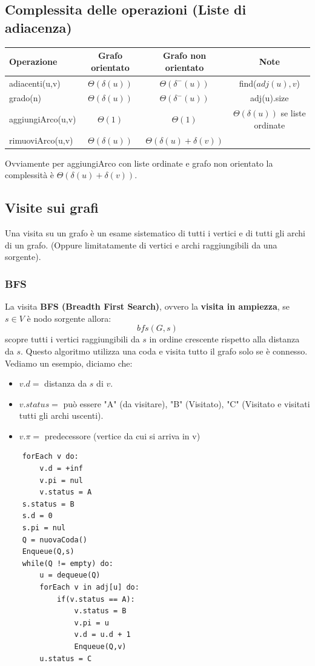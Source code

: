 \documentclass[a4paper,12pt]{article}
\begin{document}
\subsection{Complessita delle operazioni (Liste di adiacenza)}
\begin{center}
\begin{tabular}{|l|c|c|c|}
\hline
Operazione & Grafo orientato & Grafo non orientato & Note\\
\hline
adiacenti(u,v) & $\Theta(\delta(u))$ & $\Theta(\delta^-(u))$ & find($adj(u),v$)\\
grado(n) & $\Theta(\delta(u))$ & $\Theta(\delta^-(u))$ & adj(u).size\\
aggiungiArco(u,v) & $\Theta(1)$ & $\Theta(1)$ & $\Theta(\delta(u))$ se liste ordinate\\
rimuoviArco(u,v) & $\Theta(\delta(u))$ & $\Theta(\delta(u) + \delta(v))$ &\\
\hline
\end{tabular}
\end{center}
Ovviamente per aggiungiArco con liste ordinate e grafo non orientato la complessità è $\Theta(\delta(u) + \delta(v))$.

\subsection{Visite sui grafi}
Una visita su un grafo è un esame sistematico di tutti i vertici e di tutti gli archi di un grafo. (Oppure limitatamente di vertici e archi raggiungibili da una sorgente).\\
\subsubsection{BFS}
La visita \textbf{BFS (Breadth First Search)}, ovvero la \textbf{visita in ampiezza}, se $s \in V$ è nodo sorgente allora:
\[
bfs(G,s)
\]
scopre tutti i vertici raggiungibili da $s$ in ordine crescente rispetto alla distanza da $s$. Questo algoritmo utilizza una coda e visita tutto il grafo solo se è connesso.\\
Vediamo un esempio, diciamo che:
\begin{itemize}
    \item $v.d =$ distanza da $s$ di $v$.
    \item $v.status =$ può essere "A" (da visitare), "B" (Visitato), "C" (Visitato e visitati tutti gli archi uscenti).
    \item $v.\pi =$ predecessore (vertice da cui si arriva in v)
\end{itemize}
\begin{lstlisting}
    forEach v do:
        v.d = +inf
        v.pi = nul
        v.status = A
    s.status = B
    s.d = 0
    s.pi = nul
    Q = nuovaCoda()
    Enqueue(Q,s)
    while(Q != empty) do:
        u = dequeue(Q)
        forEach v in adj[u] do:
            if(v.status == A):
                v.status = B
                v.pi = u
                v.d = u.d + 1
                Enqueue(Q,v)
        u.status = C
\end{lstlisting}
\end{document}

